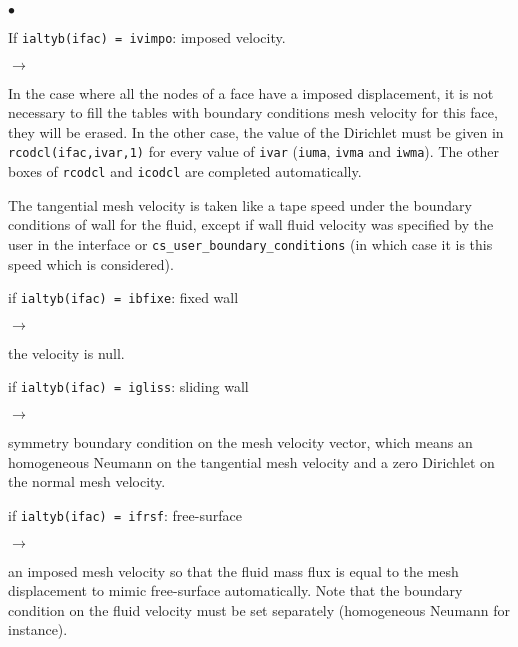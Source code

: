 {{\begin{list}{$\bullet$}{}

\item If \texttt{ialtyb(ifac) = ivimpo}: imposed velocity.

\begin{list}{$\rightarrow$}{}
\item In the case where all the nodes of a face have a imposed displacement,
 it is not necessary to fill the tables with boundary conditions
 mesh velocity for this face, they will be erased. In the other case,
 the value of the Dirichlet must be given in \texttt{rcodcl(ifac,ivar,1)} for
 every value of \texttt{ivar} (\texttt{iuma}, \texttt{ivma} and \texttt{iwma}).
 The other boxes of \texttt{rcodcl} and \texttt{icodcl} are completed automatically.

 The tangential mesh velocity is taken like a tape speed under the
 boundary conditions of wall for the fluid, except if wall fluid velocity
 was specified by the user in the interface or \texttt{cs\_user\_boundary\_conditions} (in which case
 it is this speed which is considered).
\end{list}

 \item if \texttt{ialtyb(ifac) = ibfixe}: fixed wall
\begin{list}{$\rightarrow$}{}
 \item the velocity is null.
\end{list}

 \item if \texttt{ialtyb(ifac) = igliss}: sliding wall
\begin{list}{$\rightarrow$}{}
\item symmetry boundary condition on the mesh velocity vector, which means an homogeneous Neumann on the tangential mesh velocity and a zero Dirichlet on the normal mesh velocity.
\end{list}

 \item if \texttt{ialtyb(ifac) = ifrsf}: free-surface
\begin{list}{$\rightarrow$}{}
\item an imposed mesh velocity so that the fluid mass flux is equal to the mesh displacement to mimic free-surface automatically. Note that the boundary condition on the fluid velocity must be set separately (homogeneous Neumann for instance).
\end{list}

\end{list}
}

}

